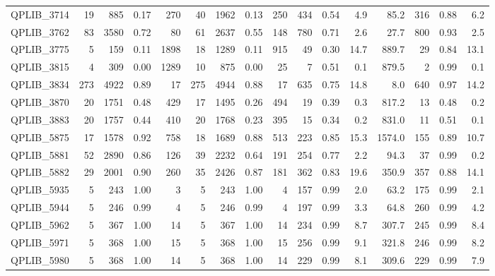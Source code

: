 \documentclass[twoside]{article}
\begin{document}
\begin{longtable}{l|rrrr|rrrr|rrr|rrrr}
		QPLIB\_3714 & 19 & 885 & 0.17 & 270 & 40 & 1962 & 0.13 & 250 & 434 & 0.54 & 4.9 & 85.2 & 316 & 0.88 & 6.2 \\
		QPLIB\_3762 & 83 & 3580 & 0.72 & 80 & 61 & 2637 & 0.55 & 148 & 780 & 0.71 & 2.6 & 27.7 & 800 & 0.93 & 2.5 \\
		QPLIB\_3775 & 5 & 159 & 0.11 & 1898 & 18 & 1289 & 0.11 & 915 & 49 & 0.30 & 14.7 & 889.7 & 29 & 0.84 & 13.1 \\
		QPLIB\_3815 & 4 & 309 & 0.00 & 1289 & 10 & 875 & 0.00 & 25 & 7 & 0.51 & 0.1 & 879.5 & 2 & 0.99 & 0.1 \\
		QPLIB\_3834 & 273 & 4922 & 0.89 & 17 & 275 & 4944 & 0.88 & 17 & 635 & 0.75 & 14.8 & 8.0 & 640 & 0.97 & 14.2 \\
		QPLIB\_3870 & 20 & 1751 & 0.48 & 429 & 17 & 1495 & 0.26 & 494 & 19 & 0.39 & 0.3 & 817.2 & 13 & 0.48 & 0.2 \\
		QPLIB\_3883 & 20 & 1757 & 0.44 & 410 & 20 & 1768 & 0.23 & 395 & 15 & 0.34 & 0.2 & 831.0 & 11 & 0.51 & 0.1 \\
		QPLIB\_5875 & 17 & 1578 & 0.92 & 758 & 18 & 1689 & 0.88 & 513 & 223 & 0.85 & 15.3 & 1574.0 & 155 & 0.89 & 10.7 \\
		QPLIB\_5881 & 52 & 2890 & 0.86 & 126 & 39 & 2232 & 0.64 & 191 & 254 & 0.77 & 2.2 & 94.3 & 37 & 0.99 & 0.2 \\
		QPLIB\_5882 & 29 & 2001 & 0.90 & 260 & 35 & 2426 & 0.87 & 181 & 362 & 0.83 & 19.6 & 350.9 & 357 & 0.88 & 14.1 \\
		QPLIB\_5935 & 5 & 243 & 1.00 & 3 & 5 & 243 & 1.00 & 4 & 157 & 0.99 & 2.0 & 63.2 & 175 & 0.99 & 2.1 \\
		QPLIB\_5944 & 5 & 246 & 0.99 & 4 & 5 & 246 & 0.99 & 4 & 197 & 0.99 & 3.3 & 64.8 & 260 & 0.99 & 4.2 \\
		QPLIB\_5962 & 5 & 367 & 1.00 & 14 & 5 & 367 & 1.00 & 14 & 234 & 0.99 & 8.7 & 307.7 & 245 & 0.99 & 8.4 \\
		QPLIB\_5971 & 5 & 368 & 1.00 & 15 & 5 & 368 & 1.00 & 15 & 256 & 0.99 & 9.1 & 321.8 & 246 & 0.99 & 8.2 \\
		QPLIB\_5980 & 5 & 368 & 1.00 & 14 & 5 & 368 & 1.00 & 14 & 229 & 0.99 & 8.1 & 309.6 & 229 & 0.99 & 7.9\end{longtable}
	\endgroup
	
	
	
\end{document}
